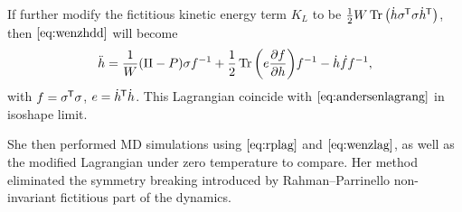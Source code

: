 If further modify the fictitious kinetic energy term $K_L$ to be
$ \frac{ 1 }{ 2 } W \Tr \big( \dot{ h } \sigma^{\mkern-1.5mu\mathsf{T}} \sigma \dot{ h }^{\mkern-1.5mu\mathsf{T}} \big)$,
then $\eqref{eq:wenzhdd}$ will become
\begin{equation}\label{eq:wenzhdd2}
	\ddot{h} = \frac{ 1 }{ W } (\Pi - P) \sigma f^{-1} + \frac{ 1 }{ 2 }
	\Tr \bigg( e \frac{ \partial f }{ \partial h } \bigg) f^{-1}
	- \dot{h} \dot{ f } f^{-1},
\end{equation}
with $f = \sigma ^{\mkern-1.5mu\mathsf{T}} \sigma$, $e = \dot{ h }^{\mkern-1.5mu\mathsf{T}} \dot{ h }$. This
Lagrangian coincide with $\eqref{eq:andersenlagrang}$ in
isoshape limit.

She then performed MD simulations using $\eqref{eq:rplag}$ and
$\eqref{eq:wenzlag}$, as well as the modified Lagrangian under zero
temperature to compare. Her method eliminated the symmetry breaking
introduced by Rahman--Parrinello non-invariant fictitious part of the dynamics.
